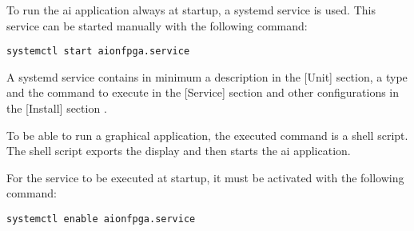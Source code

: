 To run the \acrshort{ai} application always at startup, a systemd service is used.
This service can be started manually with the following command:
\begin{lstlisting}[style=bash, caption={}, label=lst:start_service]
  systemctl start aionfpga.service
\end{lstlisting}
A systemd service contains in minimum a description in the [Unit] section, a type and the command to execute in the [Service] section and other configurations in the [Install] section \cite{systemd}.

To be able to run a graphical application, the executed command is a shell script.
The shell script exports the display and then starts the \acrshort{ai} application.

For the service to be executed at startup, it must be activated with the following command:
\begin{lstlisting}[style=bash, caption={}, label=lst:enable_service]
  systemctl enable aionfpga.service
\end{lstlisting}
